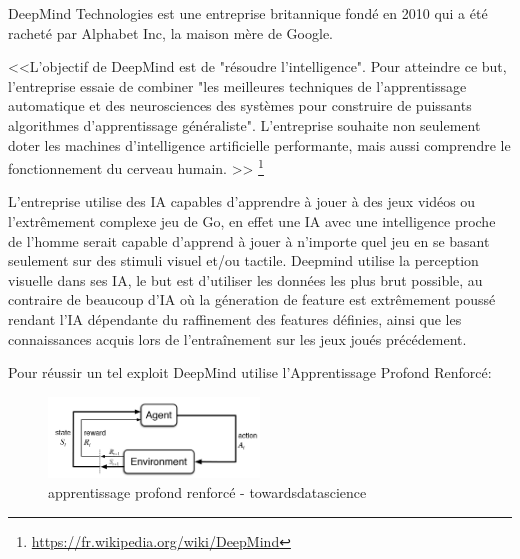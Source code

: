 DeepMind Technologies est une entreprise britannique fondé en 2010 qui a été
racheté par Alphabet Inc, la maison mère de Google. \newline

<<L’objectif de DeepMind est de "résoudre l'intelligence". Pour atteindre ce but,
l'entreprise essaie de combiner "les meilleures techniques de l'apprentissage automatique et
des neurosciences des systèmes pour construire de puissants algorithmes d'apprentissage généraliste".
L'entreprise souhaite non seulement doter les machines d'intelligence artificielle performante,
mais aussi comprendre le fonctionnement du cerveau humain. >>
\footnote{\url{https://fr.wikipedia.org/wiki/DeepMind}} \newline

L'entreprise utilise des IA capables d'apprendre à jouer à des jeux vidéos ou l'extrêmement complexe
jeu de Go, en effet une IA avec une intelligence proche de l'homme serait capable d'apprend à jouer
à n'importe quel jeu en se basant seulement sur des stimuli visuel et/ou tactile. Deepmind utilise
la perception visuelle dans ses IA, le but est d'utiliser les données les plus brut possible,
au contraire de beaucoup d'IA où la géneration de feature est extrêmement poussé rendant l'IA
dépendante du raffinement des features définies, ainsi que les connaissances acquis lors de l'entraînement
sur les jeux joués précédement. \newline

Pour réussir un tel exploit DeepMind utilise l'Apprentissage Profond Renforcé:

\begin{figure}[H]
    \centering
    \includegraphics[width=0.5\textwidth]{Images/reinforceddeeplearning}
    \caption{apprentissage profond renforcé - towardsdatascience}
    \label{fig:reinforceddeeplearning}
\end{figure}

